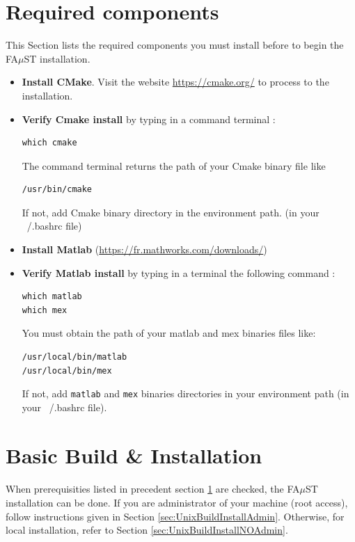 \section{Required components}\label{sec:RequiredTools}
This Section lists the required components you must install before to begin the FA$\mu$ST installation. 
\begin{itemize}
\item \textbf{Install CMake}. Visit the website \url{https://cmake.org/} to process to the installation.
\item \textbf{Verify Cmake install} by typing in a command terminal : 
\begin{lstlisting}
which cmake
\end{lstlisting}
The command terminal returns the path of your Cmake binary file like
\begin{lstlisting}
/usr/bin/cmake
\end{lstlisting}
If not, add Cmake binary directory in the environment path. (in your ~/.bashrc file)

\item \textbf{Install Matlab} (\url{https://fr.mathworks.com/downloads/})

\item \textbf{Verify Matlab install} by typing in a terminal the following command : 
\begin{lstlisting}
which matlab
which mex
\end{lstlisting}
You must obtain the path of your matlab and mex binaries files like: 
\begin{lstlisting}
/usr/local/bin/matlab
/usr/local/bin/mex
\end{lstlisting}
If not, add \texttt{matlab} and \texttt{mex} binaries directories in your environment path (in your ~/.bashrc file). 

\end{itemize}



\section{Basic Build \& Installation}\label{sec:UnixBuildInstall}
\paragraph{}When prerequisities listed in precedent section \ref{sec:RequiredTools} are checked, the FA$\mu$ST installation can be done. If you are administrator of your machine (root access), follow instructions given in Section \ref{sec:UnixBuildInstallAdmin}. Otherwise, for local installation, refer to Section \ref{sec:UnixBuildInstallNOAdmin}. 


